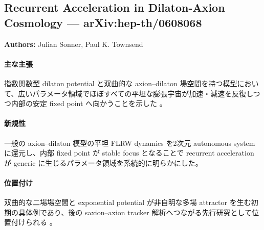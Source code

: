 \subsection{Recurrent Acceleration in Dilaton-Axion Cosmology --- arXiv:hep-th/0608068}

\textbf{Authors:} Julian Sonner, Paul K. Townsend

\paragraph{主な主張}
指数関数型 dilaton potential と双曲的な axion--dilaton 場空間を持つ模型において、広いパラメータ領域でほぼすべての平坦な膨張宇宙が加速・減速を反復しつつ内部の安定 fixed point へ向かうことを示した \cite{Sonner:2006recurrent}。

\paragraph{新規性}
一般の axion--dilaton 模型の平坦 FLRW dynamics を2次元 autonomous system に還元し、内部 fixed point が stable focus となることで recurrent acceleration が generic に生じるパラメータ領域を系統的に明らかにした。

\paragraph{位置付け}
双曲的な二場場空間と exponential potential が非自明な多場 attractor を生む初期の具体例であり、後の saxion--axion tracker 解析へつながる先行研究として位置付けられる \cite{Revello:2023saxions}。
